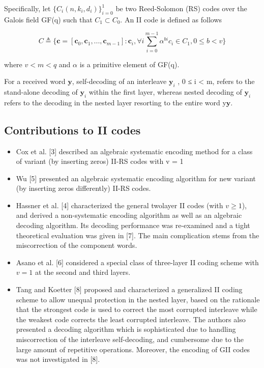 \documentclass[fontsize=12pt]{article}
\begin{document}
Specifically, let $\{\mathit{C}_i(n,k_i,d_i)\}_{i=0}^1$ be two Reed-Solomon (RS) codes over the Galois field GF(q)
such that $\mathit{C}_1\subset \mathit{C}_0$. An II code is defined as follows

\begin{equation}
\mathit{C} \triangleq \Big\{\mathbf{c}= [\mathbf{c}_0,\mathbf{c}_1,...,\mathbf{c}_{m-1}
] : \mathbf{c}_i,\forall i \sum_{i = 0}^{m-1} \alpha^{bi}c_i \in \mathit{C}_1, 0 \leq b < v\Big\}
 \end{equation}

where $v < m < q$ and $\alpha $ is a primitive element of GF(q).

For a received word $\mathbf{y}$, self-decoding of an interleave $\mathbf{y}_i$ ,
0 ≤ i < m, refers to the stand-alone decoding of $\mathbf{y}_i$
within the first layer, whereas nested decoding of $\mathbf{y}_i$ refers
to the decoding in the nested layer resorting to the entire
word y$\mathbf{y}$.

\subsection{Contributions to II codes}

\begin{itemize}
\item Cox et al. [3] described an algebraic systematic encoding
method for a class of variant (by inserting zeros) II-RS codes
with v = 1

\item Wu [5] presented an algebraic systematic encoding
algorithm for new variant (by inserting zeros differently)
II-RS codes.

\item Hassner et al. [4] characterized the general twolayer
II codes (with $v \geq 1$), and derived a non-systematic
encoding algorithm as well as an algebraic decoding algorithm.
Its decoding performance was re-examined and a tight
theoretical evaluation was given in [7]. The main complication
stems from the miscorrection of the component words.

\item Asano et al. [6] considered a special class of three-layer II
coding scheme with $v = 1$ at the second and third
layers.

\item Tang and Koetter [8] proposed and characterized a generalized
II coding scheme to allow unequal protection in the
nested layer, based on the rationale that the strongest code is
used to correct the most corrupted interleave while the weakest
code corrects the least corrupted interleave. The authors also
presented a decoding algorithm which is sophisticated due
to handling miscorrection of the interleave self-decoding, and
cumbersome due to the large amount of repetitive operations.
Moreover, the encoding of GII codes was not investigated
in [8].

\end{itemize}
\end{document}
